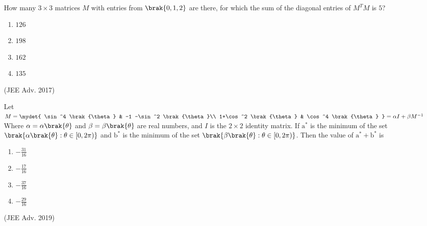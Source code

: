 \iffalse
\title{Matrices and Determinants}
\author{AI24BTECH11015 - Harshvardhan Patidar}
\section{mcq-single}
\fi

    \item
        How many $3 \times 3$ matrices $M$ with entries from $\brak{0,1,2}$ are there, for which the sum of the diagonal entries of $M^TM$ is $5$?
            \begin{enumerate}
                \item $126$
                \item $198$
                \item $162$
                \item $135$
            \end{enumerate}
            \hfill (JEE Adv. 2017)
        \item
        Let $M= \mydet{
            \sin^4 \brak{\theta} & -1 -\sin^2 \brak{\theta}\\
            1+\cos^2 \brak{\theta} & \cos^4 \brak{\theta}
            } = 
            \alpha I + \beta M^{-1}$\\
        Where $\alpha = \alpha \brak{\theta}$ and $\beta = \beta \brak{\theta}$ are real numbers, and $I$ is the $2 \times 2$ identity matrix. If $\mathrm{a^*}$ is the minimum of the set $\brak{\alpha \brak{\theta} : \theta \in [0, 2 \pi)}$ and $\mathrm{b^*}$ is the minimum of the set $\brak{\beta \brak{\theta} : \theta \in [0, 2 \pi)}$. Then the value of $\mathrm{a^*} + \mathrm{b^*}$ is
            \begin{enumerate}
                \itemsep0.4em
                \item $-\frac{31}{16}$
                \item $-\frac{17}{16}$
                \item $-\frac{37}{16}$
                \item $-\frac{29}{16}$
            \end{enumerate}
            \hfill (JEE Adv. 2019)
